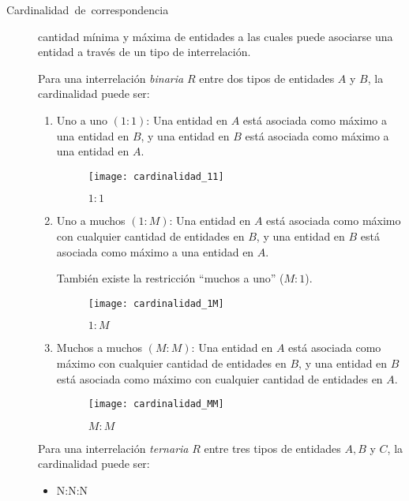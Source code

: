 \documentclass[a4paper, twoside]{article}
\begin{document}
\begin{description}
\item [{Cardinalidad~de~correspondencia}] cantidad mínima y máxima de
entidades a las cuales puede asociarse una entidad a través de un
tipo de interrelación.


Para una interrelación \emph{binaria} $R$ entre dos tipos de entidades
$A$ y $B$, la cardinalidad puede ser:
\begin{enumerate}
\item Uno a uno $(1:1)$: Una entidad en $A$ está asociada como máximo
a una entidad en $B$, y una entidad en $B$ está asociada como máximo
a una entidad en $A$.


\begin{figure}[H]
\noindent \begin{centering}
\texttt{[image: cardinalidad\_11]}
\par\end{centering}

\protect\caption{$1:1$}
\end{figure}


\item Uno a muchos $(1:M)$: Una entidad en $A$ está asociada como máximo
con cualquier cantidad de entidades en $B$, y una entidad en $B$
está asociada como máximo a una entidad en $A$.


También existe la restricción ``muchos a uno'' ($M:1$).


\begin{figure}[H]
\noindent \begin{centering}
\texttt{[image: cardinalidad\_1M]}
\par\end{centering}

\protect\caption{$1:M$}
\end{figure}


\item Muchos a muchos $(M:M)$: Una entidad en $A$ está asociada como máximo
con cualquier cantidad de entidades en $B$, y una entidad en $B$
está asociada como máximo con cualquier cantidad de entidades en $A$.


\begin{figure}[H]
\texttt{[image: cardinalidad\_MM]}

\protect\caption{$M:M$}
\end{figure}


\end{enumerate}

Para una interrelación \emph{ternaria} $R$ entre tres tipos de entidades
$A,B$ y $C$, la cardinalidad puede ser:
\begin{itemize}
\item N:N:N



\end{itemize}
\end{description}
\end{document}
